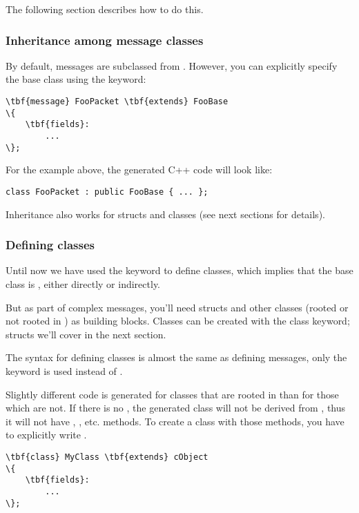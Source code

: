 The following section describes how to do this.


\subsubsection{Inheritance among message classes}

By default, messages are subclassed from . However, you can
explicitly specify the base class using the  keyword:

\begin{Verbatim}[commandchars=\\\{\}]
\tbf{message} FooPacket \tbf{extends} FooBase
\{
    \tbf{fields}:
        ...
\};
\end{Verbatim}

For the example above, the generated C++ code will look like:

\begin{verbatim}
class FooPacket : public FooBase { ... };
\end{verbatim}

Inheritance also works for structs and classes (see next sections
for details).



\subsubsection{Defining classes}

Until now we have used the  keyword to define classes, which
implies that the base class is , either directly or indirectly.

But as part of complex messages, you'll need structs and other classes
(rooted or not rooted in ) as building blocks.
Classes can be created with the  class keyword;
structs we'll cover in the next section.

The syntax for defining classes is almost the same as defining messages,
only the  keyword is used instead of .

Slightly different code is generated for classes that are rooted in
 than for those which are not.
If there is no , the generated class will not be
derived from , thus it will not have ,
, etc. methods.
To create a class with those methods, you have to explicitly write
.

\begin{Verbatim}[commandchars=\\\{\}]
\tbf{class} MyClass \tbf{extends} cObject
\{
    \tbf{fields}:
        ...
\};
\end{Verbatim}



